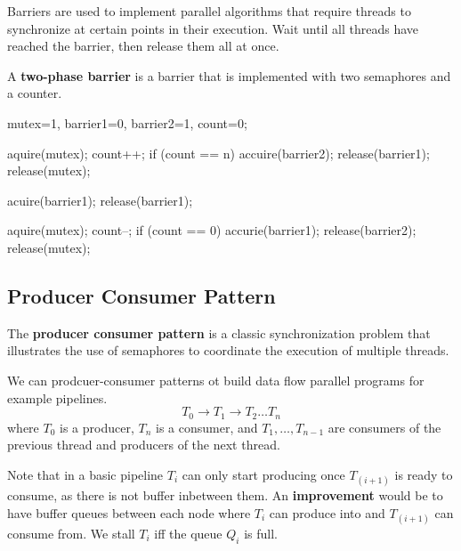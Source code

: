 \begin{remark}
    Barriers are used to implement parallel algorithms that require threads to synchronize at certain points in their execution. Wait until all threads have reached the barrier, then release them all at once.
\end{remark}

\begin{definition}
    A \textbf{two-phase barrier} is a barrier that is implemented with two semaphores and a counter.
\end{definition}

\begin{codeexample}
mutex=1, barrier1=0, barrier2=1, count=0;

aquire(mutex);
    count++; 
    if (count == n) {
        accuire(barrier2);
        release(barrier1);
    }
release(mutex);

acuire(barrier1); release(barrier1);

aquire(mutex);
    count--;
    if (count == 0) {
        accurie(barrier1);
        release(barrier2);
    }
release(mutex);
\end{codeexample}

\subsection{Producer Consumer Pattern}

\begin{definition}
    The \textbf{producer consumer pattern} is a classic synchronization problem that illustrates the use of semaphores to coordinate the execution of multiple threads.
\end{definition}

\begin{example}
    We can prodcuer-consumer patterns ot build data flow parallel programs for example pipelines.
    $$T_0 \rightarrow T_1 \rightarrow T_2 \dots T_n$$
    where $T_0$ is a producer, $T_n$ is a consumer, and $T_1, \dots, T_{n-1}$ are consumers of the previous thread and producers of the next thread.
\end{example}

\begin{remark}
    Note that in a basic pipeline $T_i$ can only start producing once $T_(i+1)$ is ready to consume, as there is not buffer inbetween them. An \textbf{improvement} would be to have buffer queues between each node where $T_i$ can produce into and $T_(i+1)$ can consume from. We stall $T_i$ iff the queue $Q_i$ is full.
\end{remark}

